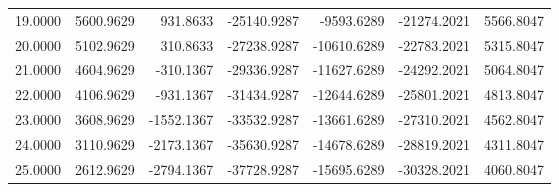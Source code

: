 \begin{table}
\begin{tabular}{lrrrrrr}
19.0000 & 5600.9629 & 931.8633 & -25140.9287 & -9593.6289 & -21274.2021 & 5566.8047 \\
20.0000 & 5102.9629 & 310.8633 & -27238.9287 & -10610.6289 & -22783.2021 & 5315.8047 \\
21.0000 & 4604.9629 & -310.1367 & -29336.9287 & -11627.6289 & -24292.2021 & 5064.8047 \\
22.0000 & 4106.9629 & -931.1367 & -31434.9287 & -12644.6289 & -25801.2021 & 4813.8047 \\
23.0000 & 3608.9629 & -1552.1367 & -33532.9287 & -13661.6289 & -27310.2021 & 4562.8047 \\
24.0000 & 3110.9629 & -2173.1367 & -35630.9287 & -14678.6289 & -28819.2021 & 4311.8047 \\
25.0000 & 2612.9629 & -2794.1367 & -37728.9287 & -15695.6289 & -30328.2021 & 4060.8047 \\
\bottomrule
\end{tabular}
\end{table}
